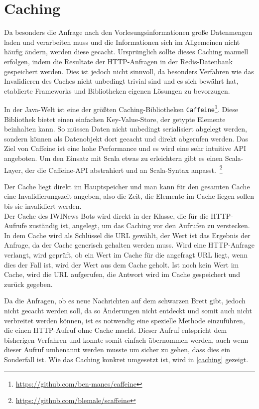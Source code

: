 \section{Caching}
Da besonders die Anfrage nach den Vorlesungsinformationen große Datenmengen laden und verarbeiten muss und die Informationen sich im Allgemeinen nicht häufig ändern, werden diese gecacht. Ursprünglich sollte dieses Caching manuell erfolgen, indem die Resultate der HTTP-Anfragen in der Redis-Datenbank gespeichert werden. Dies ist jedoch nicht sinnvoll, da besonders Verfahren wie das Invalidieren des Caches nicht unbedingt trivial sind und es sich bewährt hat, etablierte Frameworks und Bibliotheken eigenen Lösungen zu bevorzugen.

In der Java-Welt ist eine der größten Caching-Bibliotheken \texttt{Caffeine}\footnote{\url{https://github.com/ben-manes/caffeine}}. Diese Bibliothek bietet einen einfachen Key-Value-Store, der getypte Elemente beinhalten kann. So müssen Daten nicht unbedingt serialisiert abgelegt werden, sondern können als Datenobjekt dort gecacht und direkt abgerufen werden. Das Ziel von Caffeine ist eine hohe Performance und es wird eine sehr intuitive API angeboten. Um den Einsatz mit Scala etwas zu erleichtern gibt es einen Scala-Layer, der die Caffeine-API abstrahiert und an Scala-Syntax anpasst.~\footnote{\url{https://github.com/blemale/scaffeine}}

Der Cache liegt direkt im Hauptspeicher und man kann für den gesamten Cache eine Invalidierungszeit angeben, also die Zeit, die Elemente im Cache liegen sollen bis sie invalidiert werden.\\
Der Cache des IWINews Bots wird direkt in der Klasse, die für die HTTP-Aufrufe zuständig ist, angelegt, um das Caching vor den Aufrufen zu verstecken. In dem Cache wird als Schlüssel die URL gewählt, der Wert ist das Ergebnis der Anfrage, da der Cache generisch gehalten werden muss. Wird eine HTTP-Anfrage verlangt, wird geprüft, ob ein Wert im Cache für die angefragt URL liegt, wenn dies der Fall ist, wird der Wert aus dem Cache geholt. Ist noch kein Wert im Cache, wird die URL aufgerufen, die Antwort wird im Cache gespeichert und zurück gegeben.

Da die Anfragen, ob es neue Nachrichten auf dem schwarzen Brett gibt, jedoch nicht gecacht werden soll, da so Änderungen nicht entdeckt und somit auch nicht verbreitet werden können, ist es notwendig eine spezielle Methode einzuführen, die einen HTTP-Aufruf ohne Cache macht. Dieser Aufruf entspricht dem bisherigen Verfahren und konnte somit einfach übernommen werden, auch wenn dieser Aufruf umbenannt werden musste um sicher zu gehen, dass dies ein Sonderfall ist. Wie das Caching konkret umgesetzt ist, wird in \autoref{caching} gezeigt.


